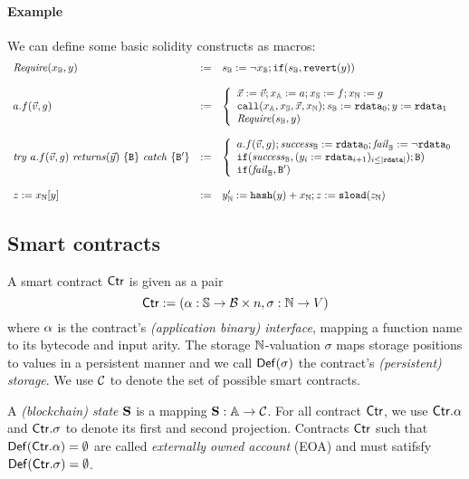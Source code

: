 \documentclass[14pt]{extarticle}
\begin{document}
\paragraph{Example} We can define some basic solidity constructs as macros:
$$ \begin{array} {lll}
\Require(x_\Bool,y) &:=& s_\Bool:=\neg x_\Bool;\switch{s_\Bool,\revert{y}}\\\\
a.f(\vec v,g) &:=& \left\{
\begin{array}{l}
    \vec x:=\vec v; x_\Addr:=a; x_\Str:=f; x_\Nat:=g \\
    \call{x_\Addr,x_\Str,\vec x,x_\Nat}; s_\Bool:=\brd_0; y:=\brd_1\\
    \Require(s_\Bool,y)
\end{array}\right. \\\\
\mathit{try}\ a.f(\vec v,g)\ \mathit{returns}(\vec y)\ \{\Byt\}\ \mathit{catch}\ \set{\Byt'} &:=& \left\{
    \begin{array}{l}
        a.f(\vec v,g); \mathit{success}_\Bool := \brd_0; \mathit{fail}_\Bool := \neg\brd_0\\ 
        \switch{\mathit{success}_\Bool, (y_i:=\brd_{i+1})_{i\leq |\brd|});\Byt} \\
        \switch{\mathit{fail}_\Bool, \Byt'}
    \end{array}\right. \\\\
z:=x_\Nat[y] &:=& y'_\Nat:=\hsh{y}+x_\Nat; z:=\sload{z_\Nat}
\end{array}
$$

\subsection{Smart contracts}
A smart contract $\mathsf{Ctr}$ is given as a pair $$\mathsf{Ctr}:=(\alpha: \mathbb{S}\to \mathcal{B}\times n, \sigma: \mathbb{N}\to V)$$ where $\alpha$ is the contract's \emph{(application binary) interface}, mapping a function name to its bytecode and input arity. The storage $\mathbb{N}$-valuation $\sigma$ maps storage positions to values in a persistent manner and we call $\mathsf{Def}(\sigma)$ the contract's \emph{(persistent) storage}. We use $\mathcal{C}$ to denote the set of possible smart contracts.

A \emph{(blockchain) state} $\mathbf{S}$ is a mapping $\mathbf{S}:\mathbb{A}\to\mathcal{C}$. For all contract $\mathsf{Ctr}$, we use $\mathsf{Ctr}.\alpha$ and $\mathsf{Ctr}.\sigma$ to denote its first and second projection. Contracts $\mathsf{Ctr}$ such that $\mathsf{Def}(\mathsf{Ctr}.\alpha)=\emptyset$ are called \emph{externally owned account} (EOA) and must satifsfy $\mathsf{Def}(\mathsf{Ctr}.\sigma)=\emptyset$.
\end{document}
